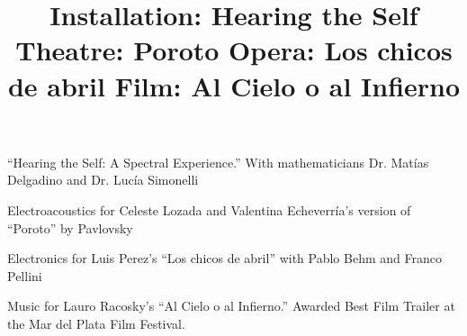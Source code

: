  \title{ Installation: Hearing the Self}
 \begin{position}
``Hearing the Self: A Spectral Experience.'' With mathematicians Dr. Matías Delgadino and Dr. Lucía Simonelli
 \end{position}

 
 \title{ Theatre: Poroto}
 \begin{position}
Electroacoustics for Celeste Lozada and Valentina Echeverría's version of ``Poroto'' by Pavlovsky
 \end{position}

 
 \title{ Opera: Los chicos de abril}
 \begin{position}
Electronics for Luis Perez's ``Los chicos de abril'' with Pablo Behm and Franco Pellini
 \end{position}

 
 
 \title{ Film: Al Cielo o al Infierno}
 \begin{position}
Music for Lauro Racosky's ``Al Cielo o al Infierno.''  Awarded Best Film Trailer at the Mar del Plata Film Festival.
 \end{position}

 

 
 
